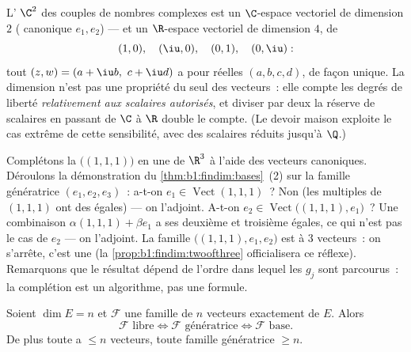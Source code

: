 \begin{example}
\label{ex:b1:findim:twodimensions}
L' $\C^2$ des couples de nombres complexes est un
$\C$-espace vectoriel de dimension $2$ ( canonique $e_1, e_2$)
--- et un $\R$-espace vectoriel de dimension $4$, de 
\[
(1, 0),\quad (\iu, 0),\quad (0, 1),\quad (0, \iu):
\]
tout $(z, w) = (a + \iu b,\ c + \iu d)$ a pour  réelles
$(a, b, c, d)$, de façon unique. La dimension n'est pas une
propriété du seul  des vecteurs~: elle compte les degrés de
liberté \emph{relativement aux scalaires autorisés}, et diviser par
deux la réserve de scalaires en passant de $\C$ à $\R$ double le
compte. (Le devoir maison exploite le cas extrême de cette
sensibilité, avec des scalaires réduits jusqu'à $\Q$.)
\end{example}

\begin{example}
\label{ex:b1:findim:completion}
Complétons la  $\bigl((1,1,1)\bigr)$ en une  de
$\R^3$ à l'aide des vecteurs canoniques. Déroulons la démonstration
du \cref{thm:b1:findim:bases}~(2) sur la famille génératrice $(e_1,
e_2, e_3)$~: a-t-on $e_1 \in \operatorname{Vect}(1,1,1)$~? Non (les
multiples de $(1,1,1)$ ont des  égales) --- on l'adjoint.
A-t-on $e_2 \in \operatorname{Vect}\bigl((1,1,1), e_1\bigr)$~? Une
combinaison $\alpha(1,1,1) + \beta e_1$ a ses deuxième et troisième
 égales, ce qui n'est pas le cas de $e_2$ --- on
l'adjoint. La famille $\bigl((1,1,1), e_1, e_2\bigr)$ est  à
$3$ vecteurs~: on s'arrête, c'est une 
(la \cref{prop:b1:findim:twoofthree} officialisera ce réflexe).
Remarquons que le résultat dépend de l'ordre dans lequel les $g_j$
sont parcourus~: la complétion est un algorithme, pas une formule.
\end{example}

\begin{proposition}\label{prop:b1:findim:twoofthree}
Soient $\dim E = n$ et $\mathcal{F}$ une famille de $n$ vecteurs
exactement de $E$. Alors
\[
\mathcal{F} \text{ libre} \iff \mathcal{F} \text{ génératrice} \iff
\mathcal{F} \text{ base}.
\]
De plus toute  a $\leq n$ vecteurs, toute famille
génératrice $\geq n$.
\end{proposition}

